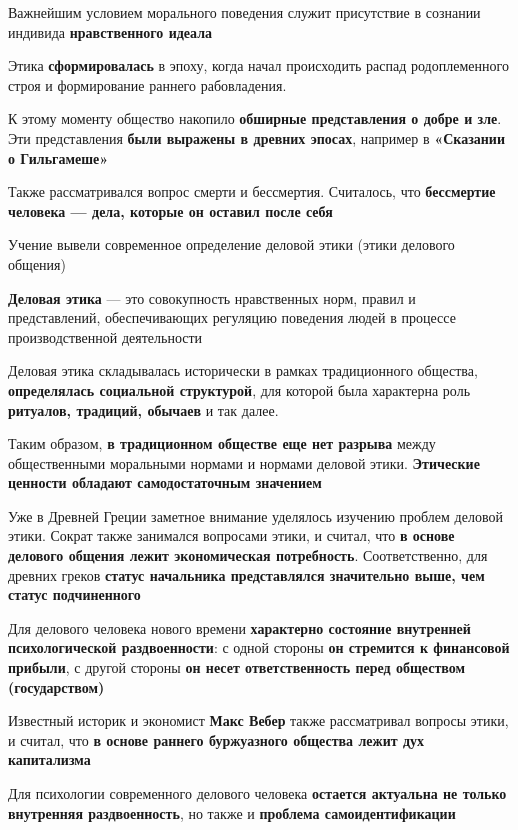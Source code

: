 \hfill

Важнейшим условием морального поведения служит присутствие в сознании индивида \textbf{нравственного идеала}

Этика \textbf{сформировалась} в эпоху, когда начал происходить распад родоплеменного строя и формирование раннего рабовладения.

К этому моменту общество накопило \textbf{обширные представления о добре и зле}. Эти представления \textbf{были выражены в древних эпосах}, например в \textbf{«Сказании о Гильгамеше»}

Также рассматривался вопрос смерти и бессмертия. Считалось, что \textbf{бессмертие человека — дела, которые он оставил после себя}

Учение вывели современное определение деловой этики (этики делового общения)

\begin{definition}
\textbf{Деловая этика} — это совокупность нравственных норм, правил и представлений, обеспечивающих регуляцию поведения людей в процессе производственной деятельности
\end{definition}

Деловая этика складывалась исторически в рамках традиционного общества, \textbf{определялась социальной структурой}, для которой была характерна роль \textbf{ритуалов, традиций, обычаев} и так далее.

Таким образом, \textbf{в традиционном обществе еще нет разрыва} между общественными моральными нормами и нормами деловой этики. \textbf{Этические ценности обладают самодостаточным значением}

Уже в Древней Греции заметное внимание уделялось изучению проблем деловой этики. Сократ также занимался вопросами этики, и считал, что \textbf{в основе делового общения лежит экономическая потребность}. Соответственно, для древних греков \textbf{статус начальника представлялся значительно выше, чем статус подчиненного}

\hfill

Для делового человека нового времени \textbf{характерно состояние внутренней психологической раздвоенности}: с одной стороны \textbf{он стремится к финансовой прибыли}, с другой стороны \textbf{он несет ответственность перед обществом (государством)}

Известный историк и экономист \textbf{Макс Вебер} также рассматривал вопросы этики, и считал, что \textbf{в основе раннего буржуазного общества лежит дух капитализма}

Для психологии современного делового человека \textbf{остается актуальна не только внутренняя раздвоенность}, но также и \textbf{проблема самоидентификации}

